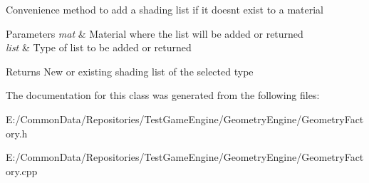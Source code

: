 Convenience method to add a shading list if it doesnt exist to a material 
\begin{DoxyParams}{Parameters}
{\em mat} & Material where the list will be added or returned \\
\hline
{\em list} & Type of list to be added or returned \\
\hline
\end{DoxyParams}
\begin{DoxyReturn}{Returns}
New or existing shading list of the selected type 
\end{DoxyReturn}


The documentation for this class was generated from the following files\+:\begin{DoxyCompactItemize}
\item 
E\+:/\+Common\+Data/\+Repositories/\+Test\+Game\+Engine/\+Geometry\+Engine/Geometry\+Factory.\+h\item 
E\+:/\+Common\+Data/\+Repositories/\+Test\+Game\+Engine/\+Geometry\+Engine/Geometry\+Factory.\+cpp\end{DoxyCompactItemize}
